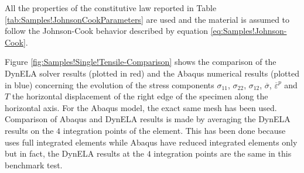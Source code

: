 All the properties of the constitutive law reported in Table \ref{tab:Samples!JohnsonCookParameters}
are used and the material is assumed to follow the Johnson-Cook behavior
described by equation \ref{eq:Samples!Johnson-Cook}.

Figure \ref{fig:Samples!Single!Tensile-Comparison} shows the comparison
of the DynELA solver results (plotted in red) and the Abaqus numerical
results (plotted in blue) concerning the evolution of the stress components
$\sigma_{11}$, $\sigma_{22}$, $\sigma_{12}$, $\overline{\sigma}$,
$\overline{\varepsilon}^{p}$ and $T$ \versus  the horizontal displacement
of the right edge of the specimen along the horizontal axis. For the
Abaqus model, the exact same mesh has been used. Comparison of Abaqus
and DynELA results is made by averaging the DynELA results on the
$4$ integration points of the element. This has been done because
\DynELA uses full integrated elements while Abaqus have reduced
integrated elements only but in fact, the DynELA results at the $4$
integration points are the same in this benchmark test.

